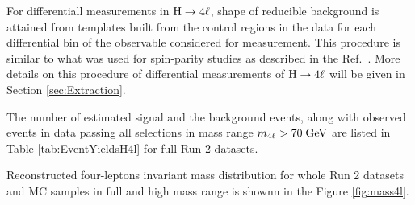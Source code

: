 For differentiall measurements in $\mathrm{H}\rightarrow4\ell$, shape of reducible background is attained from templates built from the control regions in the data for each differential bin of the observable considered for measurement. This procedure is similar to what was used for spin-parity studies as described in the Ref.~\cite{Chatrchyan:2013mxa}.
More details on this procedure
of differential measurements of $\mathrm{H}\rightarrow4\ell$ will be given in Section \ref{sec:Extraction}.
\par 
The number of estimated signal and the background events, along with observed events in data passing all selections in mass range  $m_{4\ell} > 70 \hbox{$\;\hbox{\rm GeV}$}$
are listed in Table \ref{tab:EventYieldsH4l} for full Run 2 datasets. 
\par 
Reconstructed four-leptons invariant mass distribution for whole Run 2 datasets and MC samples in full and high mass range is shownn in the Figure \ref{fig:mass4l}. 
% 

